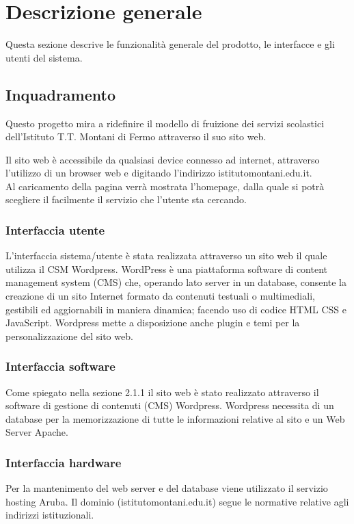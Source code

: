 \documentclass{article}
\begin{document}
	\clearpage
	
	\section{\textbf{Descrizione generale}}
     Questa sezione descrive le funzionalità generale del prodotto, le interfacce e gli utenti del sistema.

	\subsection{\textbf{Inquadramento}}
	Questo progetto mira a ridefinire il modello di fruizione dei servizi scolastici dell'Istituto T.T. Montani di Fermo attraverso il suo sito web.
	
	Il sito web è accessibile da qualsiasi device connesso ad internet, attraverso l'utilizzo di un browser web e digitando l'indirizzo istitutomontani.edu.it.\\
	Al caricamento della pagina verrà mostrata l'homepage, dalla quale si potrà scegliere il facilmente il servizio che l'utente sta cercando. 
	
	\subsubsection{\textbf{Interfaccia utente}}
	L’interfaccia sistema/utente è stata realizzata attraverso un sito web il quale utilizza il CSM Wordpress. WordPress è una piattaforma software di content management system (CMS) che, operando lato server in un database, consente la creazione di un sito Internet formato da contenuti testuali o multimediali, gestibili ed aggiornabili in maniera dinamica; facendo uso di codice HTML CSS e JavaScript. Wordpress mette a disposizione anche plugin e temi per la personalizzazione del sito web. 
	
	\subsubsection{\textbf{Interfaccia software}}
	Come spiegato nella sezione 2.1.1 il sito web è stato realizzato attraverso il software di gestione di contenuti (CMS) Wordpress. Wordpress necessita di un database per la memorizzazione di tutte le informazioni relative al sito e un Web Server Apache.  
	
	\subsubsection{\textbf{Interfaccia hardware}}
	Per la mantenimento del web server e del database viene utilizzato il servizio hosting Aruba. Il dominio (istitutomontani.edu.it) segue le normative relative agli indirizzi istituzionali.
	
\end{document}
